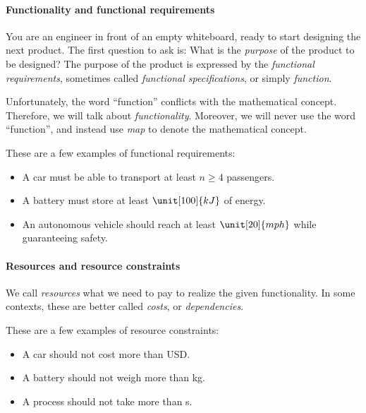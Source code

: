 \paragraph{Functionality and functional requirements} You are an engineer in front of an empty whiteboard, ready to start designing the next product.
The first question to ask is: What is the \emph{purpose} of the product to be designed? The purpose of the product is expressed by the \emph{functional requirements}, sometimes called
\emph{functional specifications}, or simply \emph{function}.

Unfortunately, the word ``function'' conflicts with the mathematical concept. Therefore, we
will talk  about \emph{functionality}. Moreover, we will never use the word ``function'', and
instead use \emph{map} to denote the mathematical concept.

\begin{example}
    These are a few examples of functional requirements:
    \begin{itemize}
        \item A car must be able to transport at least $n \geq 4$ passengers.
        \item A battery must store at least $\unit[100]{kJ}$ of energy.
        \item An autonomous vehicle should reach at least $\unit[20]{mph}$ while guaranteeing safety.
    \end{itemize}
\end{example}

\paragraph{Resources and resource constraints}

We call \emph{resources} what we need to pay to realize the given functionality.
In some contexts, these are better called \emph{costs}, or \emph{dependencies}.


\begin{example}
These are a few examples of resource constraints:
\begin{itemize}
\item A car should not cost more than \unit[15,000]{USD}.
\item A battery should not weigh more than \unit[1]{kg}.
\item A process should not take more than \unit[10]{s}.
\end{itemize}
\end{example}

